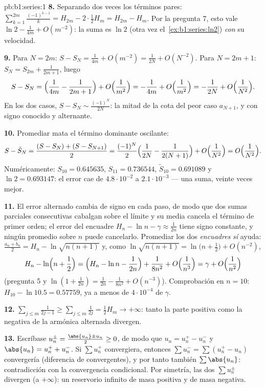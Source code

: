 \begin{solution}{pb:b1:series:1}
\textbf{8.} Separando dos veces los términos pares:
$\sum_{k=1}^{2m}\frac{(-1)^{k-1}}{k} = H_{2m} - 2\cdot\frac12
H_m = H_{2m} - H_m$. Por la pregunta 7, esto vale
$\ln 2 - \frac{1}{4m} + O(m^{-2})$: la suma es $\ln 2$
(otra vez el~\cref{ex:b1:series:ln2}) \emph{con} su velocidad.

\textbf{9.} Para $N = 2m$:
$S - S_N = \frac{1}{4m} + O(m^{-2}) = \frac{1}{2N} + O(N^{-2})$.
Para $N = 2m + 1$: $S_{N} = S_{2m} + \frac{1}{2m+1}$, luego
\[
S - S_N = \Bigl(\frac{1}{4m} - \frac{1}{2m+1}\Bigr) +
O\Bigl(\frac{1}{m^2}\Bigr)
= -\frac{1}{4m} + O\Bigl(\frac{1}{m^2}\Bigr)
= -\frac{1}{2N} + O\Bigl(\frac{1}{N^2}\Bigr).
\]
En los dos casos, $S - S_N \sim \frac{(-1)^N}{2N}$: la mitad de la
cota del peor caso $a_{N+1}$, y con signo conocido y alternante.

\textbf{10.} Promediar mata el término dominante oscilante:
\[
S - \tilde S_N = \frac{(S - S_N) + (S - S_{N+1})}{2}
= \frac{(-1)^N}{2}\Bigl(\frac{1}{2N} - \frac{1}{2(N+1)}\Bigr)
+ O\Bigl(\frac{1}{N^2}\Bigr) = O\Bigl(\frac{1}{N^2}\Bigr).
\]
Numéricamente: $S_{10} = 0.645635$, $S_{11} = 0.736544$,
$\tilde S_{10} = 0.691089$ y $\ln 2 = 0.693147$: el error cae de
$4.8\cdot10^{-2}$ a $2.1\cdot10^{-3}$ --- una suma, veinte veces
mejor.

\textbf{11.} El error alternado cambia de signo en cada paso, de modo
que dos sumas parciales consecutivas cabalgan sobre el límite y su
media cancela el término de primer orden; el error del encuadre
$H_n - \ln n - \gamma \approx \frac{1}{2n}$ tiene signo constante, y
ningún promedio sobre $n$ puede cancelarlo. Promediar los dos
\emph{encuadres} \emph{sí} ayuda:
$\frac{a_n + b_n}{2} = H_n - \ln\sqrt{n(n+1)}$ y, como
$\ln\sqrt{n(n+1)} = \ln\bigl(n + \frac12\bigr) + O(n^{-2})$,
\[
H_n - \ln\Bigl(n + \frac12\Bigr)
= \Bigl(H_n - \ln n - \frac{1}{2n}\Bigr) + \frac{1}{8n^2} +
O\Bigl(\frac{1}{n^3}\Bigr) = \gamma + O\Bigl(\frac{1}{n^2}\Bigr)
\]
(pregunta 5 y
$\ln(1 + \frac{1}{2n}) = \frac{1}{2n} - \frac{1}{8n^2} + O(n^{-3})$).
Comprobación en $n = 10$: $H_{10} - \ln 10.5 = 0.57759$, ya a menos
de $4\cdot10^{-4}$ de $\gamma$.

\textbf{12.} $\sum_{j\leq m} \frac{1}{2j-1} \geq \sum_{j \leq m}
\frac{1}{2j} = \frac12 H_m \to +\infty$: tanto la parte positiva
como la negativa de la  armónica alternada divergen.

\textbf{13.} Escríbase $u_n^\pm = \frac{\abs{u_n} \pm u_n}{2} \geq
0$, de modo que $u_n = u_n^+ - u_n^-$ y
$\abs{u_n} = u_n^+ + u_n^-$. Si $\sum u_n^+$ convergiera, entonces
$\sum u_n^- = \sum (u_n^+ - u_n)$ convergería (diferencia de 
convergentes), y por tanto también $\sum \abs{u_n}$: contradicción
con la convergencia condicional. Por simetría, las dos $\sum u_n^\pm$
divergen (a $+\infty$): un reservorio infinito de masa positiva y de
masa negativa.


\end{solution}
